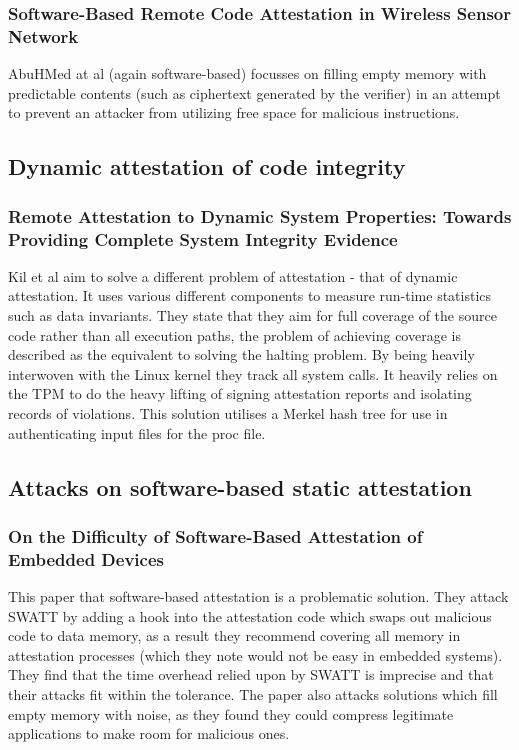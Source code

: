 \subsubsection{Software-Based Remote Code Attestation in Wireless Sensor Network}

AbuHMed at al \cite{AbuHmed2009} (again software-based) focusses on filling empty memory with predictable contents (such as ciphertext generated by the verifier) in an attempt to prevent an attacker from utilizing free space for malicious instructions.

\subsection{Dynamic attestation of code integrity} \label{dynamicAttestationSolutions}

\subsubsection{Remote Attestation to Dynamic System Properties: Towards Providing Complete System Integrity Evidence}

Kil et al \cite{Kil2009} aim to solve a different problem of attestation - that of dynamic attestation. It uses various different components to measure run-time statistics such as data invariants. They state that they aim for full coverage of the source code rather than all execution paths, the problem of achieving coverage is described as the equivalent to solving the halting problem. By being heavily interwoven with the Linux kernel they track all system calls. It heavily relies on the TPM to do the heavy lifting of signing attestation reports and isolating records of violations. This solution utilises a Merkel hash tree for use in authenticating input files for the proc file.

\subsection{Attacks on software-based static attestation} \label{attestationSolutionsAttacks}

\subsubsection{On the Difficulty of Software-Based Attestation of Embedded Devices}

This paper \cite{Castelluccia2009} that software-based attestation is a problematic solution. They attack SWATT \cite{Seshadri2004} by adding a hook into the attestation code which swaps out malicious code to data memory, as a result they recommend covering all memory in attestation processes (which they note would not be easy in embedded systems). They find that the time overhead relied upon by SWATT \cite{Seshadri2004} is imprecise and that their attacks fit within the tolerance. The paper also attacks solutions which fill empty memory with noise, as they found they could compress legitimate applications to make room for malicious ones.

